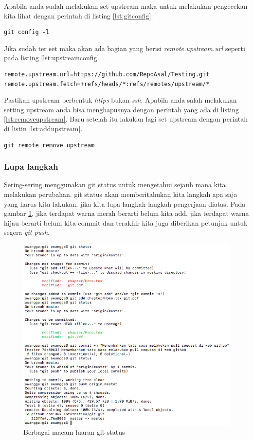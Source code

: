 Apabila anda sudah melakukan set upstream maka untuk melakukan pengecekan kita lihat dengan perintah di listing \ref{lst:gitconfig}.
\begin{lstlisting}[caption=Melihat konfigurasi git di repo komputer kita,label={lst:gitconfig}]
git config -l
\end{lstlisting}
Jika sudah ter set maka akan ada bagian yang berisi \textit{remote.upstream.url} seperti pada listing \ref{lst:upstreamconfig}.
\begin{lstlisting}[caption=Hasil perintah \textit{git config -l},label={lst:upstreamconfig}]
remote.upstream.url=https://github.com/RepoAsal/Testing.git
remote.upstream.fetch=+refs/heads/*:refs/remotes/upstream/*
\end{lstlisting}
Pastikan upstream berbentuk \textit{https} bukan \textit{ssh}. Apabila anda salah melakukan setting upstream anda bisa menghapusnya dengan perintah yang ada di listing \ref{lst:removeupstream}. Baru setelah itu lakukan lagi set upstream dengan perintah di listin \ref{lst:addupstream}.
\begin{lstlisting}[caption=Perintah menghapus upstream yang salah,label={lst:removeupstream}]
git remote remove upstream
\end{lstlisting}

\subsubsection{Lupa langkah}
Sering-sering menggunakan git status untuk mengetahui sejauh mana kita melakukan perubahan. git status akan memberitahukan kita langkah apa saja yang harus kita lakukan, jika kita lupa langkah-langkah pengerjaan diatas. Pada gambar \ref{gitstatus}, jika terdapat warna merah berarti belum kita add, jika terdapat warna hijau berarti belum kita commit dan terakhir kita juga diberikan petunjuk untuk segera \textit{git push}.
\begin{figure}[!htbp]
\centerline{\includegraphics[width=.75\textwidth]{Figures/gitstatus}}
\caption{Berbagai macam luaran git status}
\label{gitstatus}
\end{figure}

